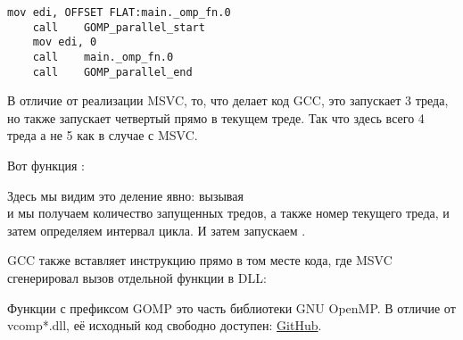 \begin{lstlisting}[caption=GCC 4.8.1,style=customasmx86]
	mov	edi, OFFSET FLAT:main._omp_fn.0
	call	GOMP_parallel_start
	mov	edi, 0
	call	main._omp_fn.0
	call	GOMP_parallel_end
\end{lstlisting}

В отличие от реализации MSVC, то, что делает код GCC, это запускает 3 треда, но также запускает 
четвертый прямо в текущем треде. Так что здесь всего 4 треда а не 5 как в случае
с MSVC.

Вот функция :
 


Здесь мы видим это деление явно: вызывая \\
 и 
мы получаем количество запущенных тредов, а также номер текущего треда, и затем определяем интервал цикла.
И затем запускаем .

GCC также вставляет инструкцию  
прямо в том месте кода, где MSVC сгенерировал вызов отдельной функции в DLL:



Функции с префиксом GOMP это часть библиотеки 
GNU OpenMP.
В отличие от vcomp*.dll, её исходный код свободно доступен: 
\href{https://github.com/mirrors/gcc/tree/master/libgomp}{GitHub}.

